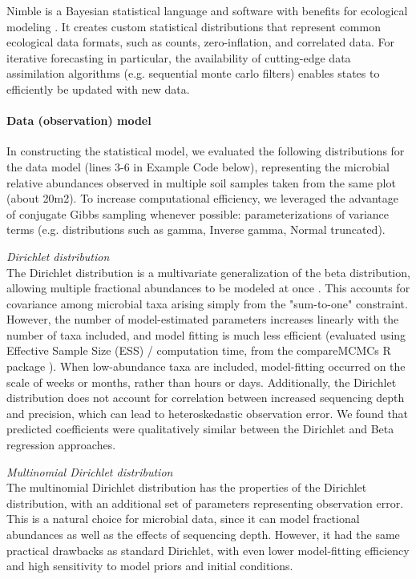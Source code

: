 \documentclass[11pt]{article}
\begin{document}
Nimble is a Bayesian statistical language and software with benefits for ecological modeling \cite{ponisio_one_2020}. It creates custom statistical distributions that represent common ecological data formats, such as counts, zero-inflation, and correlated data. For iterative forecasting in particular, the availability of cutting-edge data assimilation algorithms (e.g. sequential monte carlo filters) enables states to efficiently be updated with new data.  \\

\paragraph{Data (observation) model}

In constructing the statistical model, we evaluated the following distributions for the data model (lines 3-6 in Example Code below), representing the microbial relative abundances observed in multiple soil samples taken from the same plot (about 20m2).  To increase computational efficiency, we leveraged the advantage of conjugate Gibbs sampling whenever possible: parameterizations of variance terms (e.g. distributions such as gamma, Inverse gamma, Normal truncated).

\textit{Dirichlet distribution} \\
The Dirichlet distribution is a multivariate generalization of the beta distribution, allowing multiple fractional abundances to be modeled at once \cite{averill_soil_2021,pawlowsky-glahn_modeling_2015}. This accounts for covariance among microbial taxa arising simply from the "sum-to-one" constraint. However, the number of model-estimated parameters increases linearly with the number of taxa included, and model fitting is much less efficient (evaluated using Effective Sample Size (ESS) / computation time, from the compareMCMCs R package \cite{de_valpine_comparemcmcs_2022}). When low-abundance taxa are included, model-fitting occurred on the scale of weeks or months, rather than hours or days. Additionally, the Dirichlet distribution does not account for correlation between increased sequencing depth and precision, which can lead to heteroskedastic observation error. We found that predicted coefficients were qualitatively similar between the Dirichlet and Beta regression approaches.

\textit{Multinomial Dirichlet distribution} \\
The multinomial Dirichlet distribution has the properties of the Dirichlet distribution, with an additional set of parameters representing observation error. This is a natural choice for microbial data, since it can model fractional abundances as well as the effects of sequencing depth. However, it had the same practical drawbacks as standard Dirichlet, with even lower model-fitting efficiency and high sensitivity to model priors and initial conditions.
\end{document}
